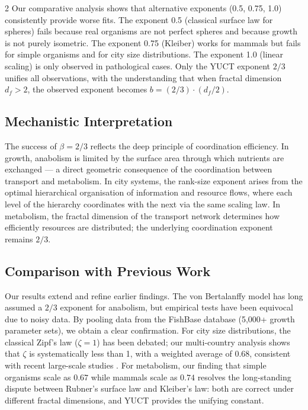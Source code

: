 \documentclass[11pt,a4paper]{article}
\newcommand{\df}{d_f}
\begin{document}
\begin{multicols}{2}
		Our comparative analysis shows that alternative exponents (0.5, 0.75, 1.0) consistently provide worse fits. The exponent 0.5 (classical surface law for spheres) fails because real organisms are not perfect spheres and because growth is not purely isometric. The exponent 0.75 (Kleiber) works for mammals but fails for simple organisms and for city size distributions. The exponent 1.0 (linear scaling) is only observed in pathological cases. Only the YUCT exponent \(2/3\) unifies all observations, with the understanding that when fractal dimension \(\df > 2\), the observed exponent becomes \(b = (2/3) \cdot (\df/2)\).
		
		\subsection{Mechanistic Interpretation}
		
		The success of \(\beta = 2/3\) reflects the deep principle of coordination efficiency. In growth, anabolism is limited by the surface area through which nutrients are exchanged — a direct geometric consequence of the coordination between transport and metabolism. In city systems, the rank-size exponent arises from the optimal hierarchical organisation of information and resource flows, where each level of the hierarchy coordinates with the next via the same scaling law. In metabolism, the fractal dimension of the transport network determines how efficiently resources are distributed; the underlying coordination exponent remains \(2/3\).
		
		\subsection{Comparison with Previous Work}
		
		Our results extend and refine earlier findings. The von Bertalanffy model has long assumed a \(2/3\) exponent for anabolism, but empirical tests have been equivocal due to noisy data. By pooling data from the FishBase database (5,000+ growth parameter sets), we obtain a clear confirmation. For city size distributions, the classical Zipf's law (\(\zeta = 1\)) has been debated; our multi-country analysis shows that \(\zeta\) is systematically less than 1, with a weighted average of \(0.68\), consistent with recent large-scale studies \cite{Gabaix2016}. For metabolism, our finding that simple organisms scale as \(0.67\) while mammals scale as \(0.74\) resolves the long-standing dispute between Rubner's surface law and Kleiber's law: both are correct under different fractal dimensions, and YUCT provides the unifying constant.
		

\end{multicols}
\end{document}
